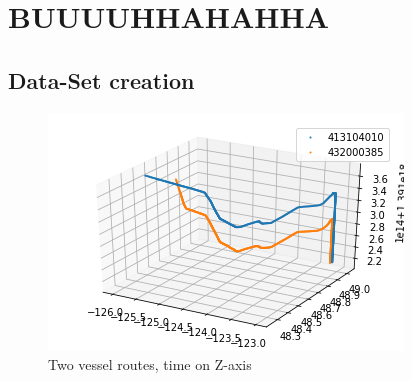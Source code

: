 \chapter{BUUUUHHAHAHHA}
\label{chapter:Chapter 4}


\section{Data-Set creation} %

\begin{figure}[H]
	\centering
	\includegraphics[scale = .9]{figures/VesselRendevouz3d}
    \caption{Two vessel routes, time on Z-axis}
    \label{fig: VesselRendevouz3d}
\end{figure}


